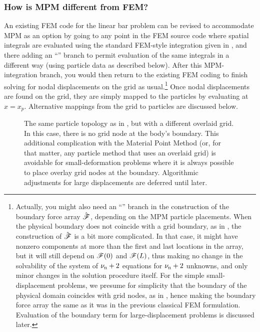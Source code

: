 \subsubsection{How is MPM different from FEM?}
An existing FEM code for the linear bar problem can be revised to accommodate MPM as an option by going to any point in the FEM source code where spatial integrals are evaluated using the standard FEM-style integration given in , and there adding an ``'' branch to permit evaluation of the same integrals in a different way (using particle data as described below). After this MPM-integration branch, you would then return to the existing FEM coding to finish solving for nodal displacements on the grid as usual.\footnote{Actually, you might also need an ``'' branch in the construction of the boundary force array $\hat{\bm{\mathscr{F}}}$, depending on the MPM particle placements. 
%
When the physical boundary does not coincide with a grid boundary, as in , the construction of $\hat{\bm{\mathscr{F}}}$ is a bit more complicated. In that case, it might have nonzero components at more than the first and last locations in the array, but it will still depend on $\mathscr{F}(0)$ and $\mathscr{F}(L)$, thus making no change in the solvability of the system of ${\nu_\text{n}}+2$ equations for ${\nu_\text{n}}+2$ unknowns, and only minor changes in the solution procedure itself.
%
For the simple \oneD small-displacement problems, we presume for simplicity that the boundary of the physical domain coincides with grid nodes, as in , hence making the boundary force array the same as it was in the previous classical FEM formulation. Evaluation of the boundary term for large-displacement problems is discussed later.}
Once nodal displacements are found on the grid, they are simply mapped to the particles by evaluating  at $x=x_p$. Alternative mappings from the grid to particles are discussed below.

%
\begin{figure}[h]
\caption{The same particle topology as in , but with a different overlaid grid. In this case, there is no grid node at the body's boundary. This additional complication with the Material Point Method (or, for that matter, any particle method that uses an overlaid grid) is avoidable for small-deformation problems where it is always possible to place overlay grid nodes at the boundary. Algorithmic adjustments for large displacements are deferred until later.}
\label{fig:particlesOnOneDgridDifferent}
\end{figure}
%



